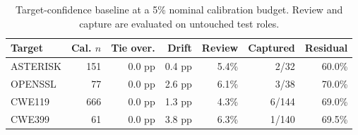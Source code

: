 \begin{table}[t]
\centering
\caption{Target-confidence baseline at a 5\% nominal calibration budget. Review and capture are evaluated on untouched test roles.}
\label{tab:confidence-baseline}
\scriptsize
\begin{tabular}{lrrrrrr}
\toprule
Target & Cal. $n$ & Tie over. & Drift & Review & Captured & Residual \\
\midrule
ASTERISK & 151 & 0.0 pp & 0.4 pp & 5.4\% & 2/32 & 60.0\% \\
OPENSSL & 77 & 0.0 pp & 2.6 pp & 6.1\% & 3/38 & 70.0\% \\
CWE119 & 666 & 0.0 pp & 1.3 pp & 4.3\% & 6/144 & 69.0\% \\
CWE399 & 61 & 0.0 pp & 3.8 pp & 6.3\% & 1/140 & 69.5\% \\
\bottomrule
\end{tabular}
\end{table}
